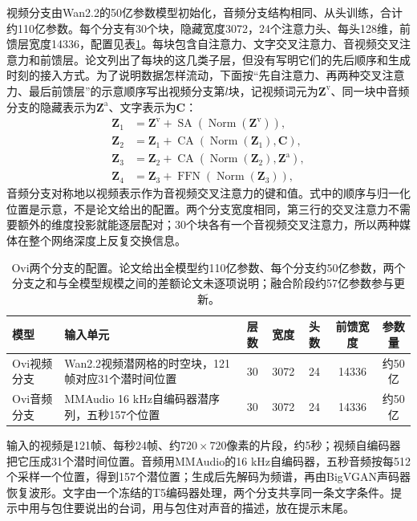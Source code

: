视频分支由Wan2.2的50亿参数模型初始化，音频分支结构相同、从头训练，合计约110亿参数。每个分支有30个块，隐藏宽度3072，24个注意力头、每头128维，前馈层宽度14336，配置见表\ref{tab:vision-multigen-ovi-config}。每块包含自注意力、文字交叉注意力、音视频交叉注意力和前馈层。论文列出了每块的这几类子层，但没有写明它们的先后顺序和生成时刻的接入方式。为了说明数据怎样流动，下面按“先自注意力、再两种交叉注意力、最后前馈层”的示意顺序写出视频分支第$l$块，记视频词元为$\bm Z^{\mathrm v}$、同一块中音频分支的隐藏表示为$\bm Z^{\mathrm a}$、文字表示为$\bm C$：
\begin{equation}
 \begin{aligned}
  \bm Z_1&=\bm Z^{\mathrm v}+\operatorname{SA}(\operatorname{Norm}(\bm Z^{\mathrm v})),\\
  \bm Z_2&=\bm Z_1+\operatorname{CA}(\operatorname{Norm}(\bm Z_1),\bm C),\\
  \bm Z_3&=\bm Z_2+\operatorname{CA}(\operatorname{Norm}(\bm Z_2),\bm Z^{\mathrm a}),\\
  \bm Z_4&=\bm Z_3+\operatorname{FFN}(\operatorname{Norm}(\bm Z_3)),
 \end{aligned}
 \label{eq:vision-multigen-ovi-block}
\end{equation}
音频分支对称地以视频表示作为音视频交叉注意力的键和值。式中的顺序与归一化位置是示意，不是论文给出的配置。两个分支宽度相同，第三行的交叉注意力不需要额外的维度投影就能逐层配对；30个块各有一个音视频交叉注意力，所以两种媒体在整个网络深度上反复交换信息。

\begin{table}[tbp]
 \centering
 \small
 \begin{tabularx}{\linewidth}{@{}p{28mm}Xccccc@{}}
  \toprule
  模型 & 输入单元 & 层数 & 宽度 & 头数 & 前馈宽度 & 参数量 \\
  \midrule
  Ovi视频分支 & Wan2.2视频潜网格的时空块，121帧对应31个潜时间位置 & 30 & 3072 & 24 & 14336 & 约50亿 \\
  Ovi音频分支 & MMAudio 16 kHz自编码器潜序列，五秒157个位置 & 30 & 3072 & 24 & 14336 & 约50亿 \\
  \bottomrule
 \end{tabularx}
 \caption{Ovi两个分支的配置。论文给出全模型约110亿参数、每个分支约50亿参数，两个分支之和与全模型规模之间的差额论文未逐项说明；融合阶段约57亿参数参与更新。}
 \label{tab:vision-multigen-ovi-config}
\end{table}
\FloatBarrier

输入的视频是121帧、每秒24帧、约$720\times720$像素的片段，约5秒；视频自编码器把它压成31个潜时间位置。音频用MMAudio的16 kHz自编码器，五秒音频按每512个采样一个位置，得到157个潜位置；生成后先解码为频谱，再由BigVGAN声码器恢复波形。文字由一个冻结的T5编码器处理，两个分支共享同一条文字条件。提示中用与包住要说出的台词，用与包住对声音的描述，放在提示末尾。

